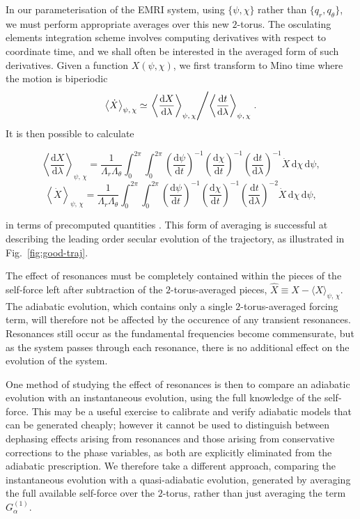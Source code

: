 \documentclass[aps,prd,amsfonts,amssymb,amsmath,nofootinbib,reprint,showpacs,superscriptaddress,twocolumn]{revtex4}
\newcommand{\figref}[1]{Fig.\ \ref{fig:#1}}
\newcommand{\dd}{\ensuremath{\mathrm{d}}}
\newcommand{\diff}[2]{\ensuremath{\dfrac{\dd {#1}}{\dd {#2}}}}
\newcommand{\intd}[4]{\ensuremath{\int_{#1}^{#2}{#3}\,\dd{#4}}}
\begin{document}
In our parameterisation of the EMRI system, using $\{\psi,\chi\}$ rather than $\{q_r,q_\theta\}$, we must perform appropriate averages over this new $2$-torus. The osculating elements integration scheme involves computing derivatives with respect to coordinate time, and we shall often be interested in the averaged form of such derivatives. Given a function $X(\psi,\chi)$, we first transform to Mino time where the motion is biperiodic
\begin{equation}
\left\langle \dot{X}\right\rangle_{\psi,\,\chi} \simeq \left.\left\langle \diff{X}{\lambda}\right\rangle_{\psi,\,\chi}\middle/\left\langle \diff{t}{\lambda}\right\rangle_{\psi,\,\chi}\right..
\end{equation}
It is then possible to calculate
\begin{widetext}\begin{equation}
\label{eq:2torus-average}
\left\langle \diff{X}{\lambda}\right\rangle_{\psi,\,\chi} = \frac1{\Lambda_r\Lambda_\theta} \intd{0}{2\pi}{ \intd{0}{2\pi}{ \left(\diff{\psi}{t}\right)^{-1} \left(\diff{\chi}{t}\right)^{-1} \left(\diff{t}{\lambda}\right)^{-1} \dot{X} }{\chi} }{\psi},
\end{equation}
\begin{equation}
\left\langle \dot{X}\right\rangle_{\psi,\,\chi} = \frac1{\Lambda_r\Lambda_\theta} \intd{0}{2\pi}{ \intd{0}{2\pi}{ \left(\diff{\psi}{t}\right)^{-1} \left(\diff{\chi}{t}\right)^{-1} \left(\diff{t}{\lambda}\right)^{-2} \dot{X} }{\chi} }{\psi},
\end{equation}\end{widetext}
in terms of precomputed quantities \cite{Drasco2005}. This form of averaging is successful at describing the leading order secular evolution of the trajectory, as illustrated in \figref{good-traj}.

The effect of resonances must be completely contained within the pieces of the self-force left after subtraction of the $2$-torus-averaged pieces, $\hat{X}\equiv X-\langle X\rangle_{\psi,\,\chi}$. The adiabatic evolution, which contains only a single $2$-torus-averaged forcing term, will therefore not be affected by the occurence of any transient resonances. Resonances still occur as the fundamental frequencies become commensurate, but as the system passes through each resonance, there is no additional effect on the evolution of the system.

One method of studying the effect of resonances is then to compare an adiabatic evolution with an instantaneous evolution, using the full knowledge of the self-force. This may be a useful exercise to calibrate and verify adiabatic models that can be generated cheaply; however it cannot be used to distinguish between dephasing effects arising from resonances and those arising from conservative corrections to the phase variables, as both are explicitly eliminated from the adiabatic prescription. We therefore take a different approach, comparing the instantaneous evolution with a quasi-adiabatic evolution, generated by averaging the full available self-force over the $2$-torus, rather than just averaging the term $G_\alpha^{(1)}$.
\end{document}
